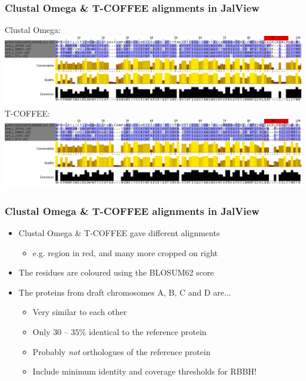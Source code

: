 \documentclass[table]{beamer}
\begin{document}
\begin{frame}[fragile]
\frametitle{Clustal Omega \& T-COFFEE alignments in JalView}
\begin{center}
Clustal Omega: \\
\includegraphics[width=\textwidth]{images/glucanase_clustalo.png} \\
T-COFFEE: \\
\includegraphics[width=\textwidth]{images/glucanase_tcoffee.png}
\end{center}
\end{frame}

\begin{frame}[fragile]
\frametitle{Clustal Omega \& T-COFFEE alignments in JalView}
\begin{center}
\begin{itemize}
\item Clustal Omega \& T-COFFEE gave different alignments
    \begin{itemize}
    \item e.g. region in red, and many more cropped on right
    \end{itemize}
\item The residues are coloured using the BLOSUM62 score
\item The proteins from draft chromosomes A, B, C and D are...
    \begin{itemize}
    \item Very similar to each other
    \item Only $30$ -- $35\%$ identical to the reference protein
    \item Probably \textit{not} orthologues of the reference protein
    \item Include minimum identity and coverage thresholds for RBBH!
    \end{itemize}
\end{itemize}
\end{center}
\end{frame}
\end{document}
